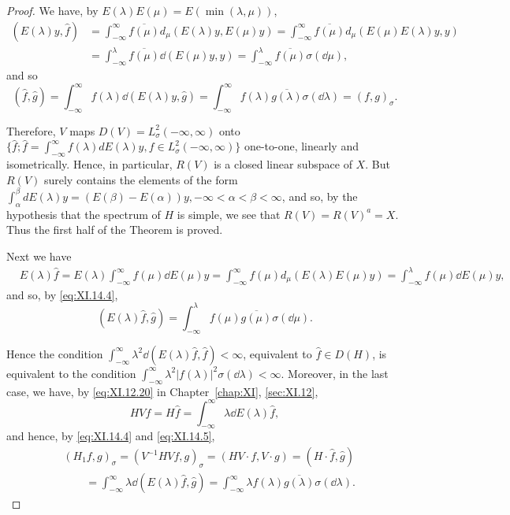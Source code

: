 \begin{proof}
 We have, by $E(\lambda)E(\mu) = E(\min (\lambda ,\mu))$, 
\[
\begin{aligned} (E (\lambda) y, \hat {f}) & = \int_{- \infty} ^{\infty} \overline {{f (\mu)}} d _{\mu} (E (\lambda) y, E (\mu) y) = \int_{- \infty} ^{\infty} \overline {{f (\mu)}} d _{\mu} (E (\mu) E (\lambda) y, y) \\ & = \int_{- \infty} ^{\lambda} \overline {{f (\mu)}} \dd (E (\mu) y, y) = \int_{- \infty} ^{\lambda} \overline {{f (\mu)}} \sigma (\dd \mu), \end{aligned}
\]
and so 
\begin{equation}\label{eq:XI.14.4}
(\hat {f}, \hat {g}) = \int_{- \infty} ^{\infty} f (\lambda) \dd (E (\lambda) y, \hat {g}) = \int_{- \infty} ^{\infty} f (\lambda) \overline {{g (\lambda)}} \sigma (\dd \lambda) = (f, g) _{\sigma}. \end{equation}

Therefore, $V$ maps $D(V) = L_{\sigma}^{2}(-\infty, \infty)$ onto $\{\hat{f}; \hat{f} = \int_{-\infty}^{\infty} f(\lambda) dE(\lambda) y, f \in L_{\sigma}^{2}(-\infty, \infty)\}$ one-to-one, linearly and isometrically. Hence, in particular, $R(V)$ is a closed linear subspace of $X$. But $R(V)$ surely contains the elements of the form $\int_{\alpha}^{\beta} dE(\lambda) y = (E(\beta) - E(\alpha)) y, -\infty < \alpha < \beta < \infty$, and so, by the hypothesis that the spectrum of $H$ is simple, we see that $R(V) = R(V)^a = X$. Thus the first half of the Theorem is proved. 

Next we have 
\[
\begin{aligned}
&E (\lambda) \hat {f}  = E (\lambda) \int_{- \infty} ^{\infty} f (\mu) \dd E (\mu) y = \int_{- \infty} ^{\infty} f (\mu) d _{\mu} (E (\lambda) E (\mu) y) = \int_{- \infty} ^{\lambda} f (\mu) \dd E (\mu) y,
\end{aligned}
\]
and so, by \eqref{eq:XI.14.4}, 
\begin{equation}\label{eq:XI.14.5}
(E (\lambda) \hat {f}, \hat {g}) = \int_{- \infty} ^{\lambda} f (\mu) \overline {{g (\mu)}} \sigma (\dd \mu).
\end{equation}

Hence the condition $\int_{-\infty}^{\infty}\lambda^{2}\dd(E(\lambda)\hat{f},\hat{f})<\infty$, equivalent to $\hat{f}\in D(H)$, is equivalent to the condition $\int_{-\infty}^{\infty}\lambda^{2}|f(\lambda)|^{2}\sigma(\dd\lambda)<\infty$. Moreover, in the last case, we have, by \eqref{eq:XI.12.20} in Chapter~\ref{chap:XI}, \ref{sec:XI.12}, 
\[
H V f = H \hat {f} = \int_{- \infty} ^{\infty} \lambda \dd E (\lambda) \hat {f},
\]
and hence, by \eqref{eq:XI.14.4} and \eqref{eq:XI.14.5}, 
\[
\begin{aligned} & {(H _{1} f, g) _{\sigma} = (V ^{-1} H V f, g) _{\sigma} = (H V \cdot f, V \cdot g) = (H \cdot \hat {f}, \hat {g})} \\ & {\qquad = \int_{- \infty} ^{\infty} \lambda \dd (E (\lambda) \hat {f}, \hat {g}) = \int_{- \infty} ^{\infty} \lambda f (\lambda) \overline {{g (\lambda)}} \sigma (\dd \lambda).} \end{aligned}
\]


\end{proof}
